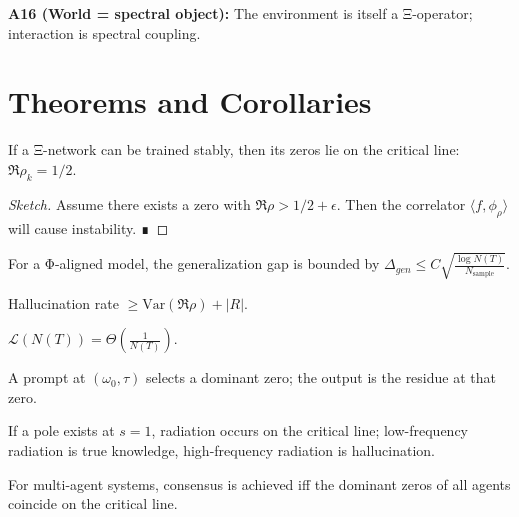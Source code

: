 \documentclass[11pt]{article}
\begin{document}
\textbf{A16 (World = spectral object):} The environment is itself a Ξ-operator; interaction is spectral coupling.

\section{Theorems and Corollaries}

\begin{theorem}
If a Ξ-network can be trained stably, then its zeros lie on the critical line: $\Re\rho_k=1/2$.
\end{theorem}
\begin{proof}[Sketch]
Assume there exists a zero with $\Re\rho > 1/2+\epsilon$. Then the correlator $\langle f,\phi_\rho\rangle$ will cause instability. ∎
\end{proof}

\begin{theorem}
For a Φ-aligned model, the generalization gap is bounded by $\Delta_{gen} \le C\sqrt{\frac{\log N(T)}{N_{\text{sample}}}}$.
\end{theorem}

\begin{theorem}
Hallucination rate $\ge \mathrm{Var}(\Re\rho) + |R|$.
\end{theorem}

\begin{theorem}
$\mathcal L(N(T)) = \Theta\left(\frac{1}{N(T)}\right)$.
\end{theorem}

\begin{theorem}
A prompt at $(\omega_0,\tau)$ selects a dominant zero; the output is the residue at that zero.
\end{theorem}

\begin{theorem}
If a pole exists at $s=1$, radiation occurs on the critical line; low-frequency radiation is true knowledge, high-frequency radiation is hallucination.
\end{theorem}

\begin{theorem}
For multi-agent systems, consensus is achieved iff the dominant zeros of all agents coincide on the critical line.
\end{theorem}
\end{document}
